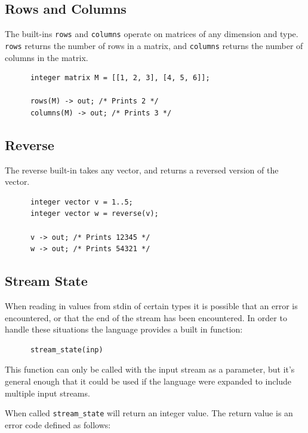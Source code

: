\documentclass{article}
\begin{document}
  \subsection{Rows and Columns}\label{sec:rowsColumns}

    The built-ins \texttt{rows} and \texttt{columns} operate on matrices of any dimension and type. \texttt{rows}
    returns the number of rows in a matrix, and \texttt{columns} returns the number of columns in the matrix.

    \begin{lstlisting}
      integer matrix M = [[1, 2, 3], [4, 5, 6]];

      rows(M) -> out; /* Prints 2 */
      columns(M) -> out; /* Prints 3 */
    \end{lstlisting}


  \subsection{Reverse}\label{sec:reverse}

    The reverse built-in takes any vector, and returns a reversed version of the vector.

    \begin{lstlisting}
      integer vector v = 1..5;
      integer vector w = reverse(v);

      v -> out; /* Prints 12345 */
      w -> out; /* Prints 54321 */
    \end{lstlisting}

  \subsection{Stream State}\label{sec:streamState}
    When reading in values from stdin of certain types it is possible that an error is encountered, or that the end
    of the stream has been encountered. In order to handle these situations the language provides a built in
    function:

    \begin{lstlisting}
      stream_state(inp)
    \end{lstlisting}

    This function can only be called with the input stream as a parameter, but it's general enough that it could be
    used if the language were expanded to include multiple input streams.

    When called \texttt{stream\_state} will return an integer value. The return value is an error code defined as
    follows:
\end{document}
